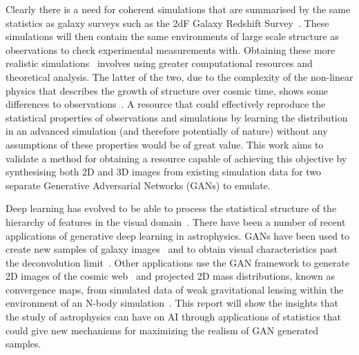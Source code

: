 \documentclass[twocolumn]{article}
\numberwithin{equation}{section}
\begin{document}
Clearly there is a need for coherent simulations that are summarised by the same statistics as galaxy surveys such as 
the 2dF Galaxy Redshift Survey~\cite{2df}. These simulations will then contain the same environments of large scale
structure as observations to check experimental measurements with. Obtaining these more realistic 
simulations~\cite{mill2sim, millxxlsim} involves using greater computational resources and theoretical analysis. The 
latter of the two, due to the complexity of the non-linear physics that describes the growth of structure over cosmic time, 
shows some differences to observations~\cite{mill_diffs}. A resource that could effectively reproduce the statistical 
properties of observations and simulations by learning the distribution in an advanced simulation (and therefore potentially
of nature) without any assumptions of these properties would be of great value. This work aims to validate a method for 
obtaining a resource capable of achieving this objective by synthesising both 2D and 3D images from existing simulation 
data for two separate Generative Adversarial Networks (GANs) to emulate. 

Deep learning has evolved to be able to process the statistical structure of the hierarchy of features in the visual 
domain~\cite{nvidia_gan}. There have been a number of recent applications of generative deep learning in astrophysics. 
GANs have been used to create new samples of galaxy images~\cite{gal_im_gen2} and to obtain visual characteristics past
the deconvolution limit~\cite{gal_im_gen3}. Other applications use the GAN framework to generate 2D images of the cosmic 
web~\cite{web_gan} and projected 2D mass distributions, known as convergence maps, from simulated data of weak 
gravitational lensing within the environment of an N-body simulation~\cite{cosmogan}. This report will show the insights 
that the study of astrophysics can have on AI through applications of statistics that could give new mechanisms for
maximizing the realism of GAN generated samples. 
\end{document}
